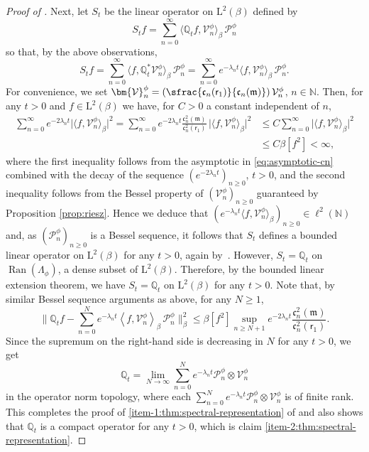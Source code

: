 \documentclass[10pt]{amsart}
\newcommand{\Psfrac}[2]{(\sfrac{#1}{#2})}
\theoremstyle{plain}
\theoremstyle{definition}
\newcommand{\bbnorm}[1]{\biggl\lVert#1\biggr\rVert}
\DeclareMathOperator{\Ran}{Ran}
\newcommand{\N}{\mathbb{N}}
\renewcommand{\P}{\mathcal{P}}
\newcommand{\V}{\mathcal{V}}
\newcommand{\J}{\mathds{Q}}
\newcommand{\Leb}{\mathrm{L}}
\newcommand{\m}{\mathfrak{m}}
\newcommand{\vat}{{\mathsf{r}_1}}
\let\bpsi\beta
\begin{document}
\begin{proof}[Proof of ]
Next, let $S_t$ be the linear operator on $\Leb^2(\bpsi)$ defined by
\begin{equation*}
S_t f = \sum_{n=0}^\infty \langle \J_t f, \V_n^\phi \rangle_{\bpsi}\, \P_n^\phi
\end{equation*}
so that, by the above observations,
\begin{equation*}
S_t f = \sum_{n=0}^\infty \langle f, \J_t^* \V_n^\phi \rangle_{\bpsi}\, \P_n^\phi = \sum_{n=0}^\infty e^{-\lambda_n t} \langle f, \V_n^\phi \rangle_{\bpsi}\, \P_n^\phi.
\end{equation*}
For convenience, we set ${\bm{\V}}_n^\phi = \Psfrac{\mathfrak{c}_n(\vat)}{\mathfrak{c}_n(\m)}\, \V_n^\phi$, $n \in \N$. Then, for any $t > 0$ and $f \in \Leb^2(\bpsi)$ we have, for $C >0$ a constant independent of $n$,
\begin{align*}
\sum_{n=0}^\infty e^{-2\lambda_n t} \bigl|\bigl\langle f, \V_n^\phi \bigr\rangle_{\bpsi}\bigr|^2 = \sum_{n=0}^\infty e^{-2 \lambda_n t} \frac{\mathfrak{c}_n^2(\m)}{\mathfrak{c}_n^2(\vat)}\, \bigl|\bigl\langle f, {\bm{\V}}_n^\phi\bigr\rangle_{\bpsi}\bigr|^2 &\leq C \sum_{n=0}^\infty \bigl|\bigl\langle f, {\bm{\V}}_n^\phi \bigr\rangle_{\bpsi}\bigr|^2\\
&\leq C \bpsi [f^2] < \infty,
\end{align*}
where the first inequality follows from the asymptotic in \eqref{eq:asymptotic-cn} combined with the decay of the sequence $(e^{-2\lambda_n t})_{n \geq 0}$, $t > 0$, and the second inequality follows from the Bessel property of $({\bm{\V}}_n^\phi )_{n \geq 0}$ guaranteed by Proposition \ref{prop:riesz}. Hence we deduce that $\left(e^{-\lambda_n t} \langle f, \V_n^\phi \rangle_{\bpsi}\right)_{n \geq 0} \in \ell^2(\N)$ and, as $(\P_n^\phi)_{n \geq 0}$ is a Bessel sequence, it follows that $S_t$ defines a bounded linear operator on $\Leb^2(\bpsi)$ for any $t > 0$, again by~\cite[Th.\,3.1.3]{Christensen2003a}. However, $S_t = \J_t$ on $\Ran(\Lambda_\phi)$, a dense subset of $\Leb^2(\bpsi)$. Therefore, by the bounded linear extension theorem, we have $S_t = \J_t$ on $\Leb^2(\bpsi)$ for any $t > 0$. Note that, by similar Bessel sequence arguments as above, for any $N \geq 1$,
\begin{equation*}
\bbnorm{\J_tf -\sum_{n=0}^N e^{-\lambda_n t} \left\langle f, \V_n^\phi \right\rangle_{\bpsi}\, \P_n^\phi}_\bpsi^2 \leq \bpsi [f^2] \sup_{n \geq N+1} e^{-2 \lambda_n t} \frac{\mathfrak{c}_n^2(\m)}{\mathfrak{c}_n^2(\vat)}.
\end{equation*}
Since the supremum on the right-hand side is decreasing in $N$ for any $t > 0$, we get
\begin{equation*}
\J_t = \lim_{N \to \infty} \sum_{n=0}^N e^{-\lambda_n t} \P_n^\phi \otimes \V_n^\phi
\end{equation*}
in the operator norm topology, where each $\sum_{n=0}^N e^{-\lambda_n t} \P_n^\phi \otimes \V_n^\phi$ is of finite rank. This completes the proof of \eqref{item-1:thm:spectral-representation} of  and also shows that $\J_t$ is a compact operator for any $t > 0$, which is claim \eqref{item-2:thm:spectral-representation}.


\end{proof}
\end{document}
